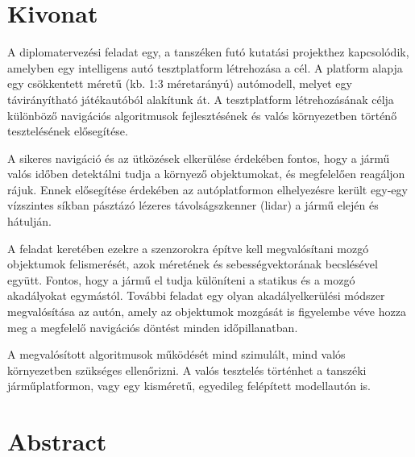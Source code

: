 \setcounter{page}{1}

\selecthungarian

\chapter*{Kivonat}

A diplomatervezési feladat egy, a tanszéken futó kutatási projekthez kapcsolódik, amelyben egy intelligens autó tesztplatform létrehozása a cél. A platform alapja egy csökkentett méretű (kb. 1:3 méretarányú) autómodell, melyet egy távirányítható játékautóból alakítunk át. A tesztplatform létrehozásának célja különböző navigációs algoritmusok fejlesztésének és valós környezetben történő tesztelésének elősegítése.

A sikeres navigáció és az ütközések elkerülése érdekében fontos, hogy a jármű valós időben detektálni tudja a környező objektumokat, és megfelelően reagáljon rájuk. Ennek elősegítése érdekében az autóplatformon elhelyezésre került egy‑egy vízszintes síkban pásztázó lézeres távolságszkenner (lidar) a jármű elején és hátulján.

A feladat keretében ezekre a szenzorokra építve kell megvalósítani mozgó objektumok felismerését, azok méretének és sebességvektorának becslésével együtt. Fontos, hogy a jármű el tudja különíteni a statikus és a mozgó akadályokat egymástól. További feladat egy olyan akadályelkerülési módszer megvalósítása az autón, amely az objektumok mozgását is figyelembe véve hozza meg a megfelelő navigációs döntést minden időpillanatban.

A megvalósított algoritmusok működését mind szimulált, mind valós környezetben szükséges ellenőrizni. A valós tesztelés történhet a tanszéki járműplatformon, vagy egy kisméretű, egyedileg felépített modellautón is.


\vfill
\selectenglish


\chapter*{Abstract}

